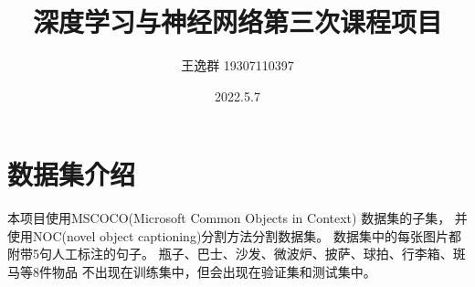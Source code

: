 \documentclass[12pt]{article}
\title{深度学习与神经网络第三次课程项目}
\author{王逸群 19307110397}
\date{2022.5.7}
\begin{document}
\maketitle

\section{数据集介绍}

本项目使用MSCOCO(Microsoft Common Objects in Context)
数据集的子集，
并使用NOC(novel object captioning)分割方法分割数据集。
数据集中的每张图片都附带5句人工标注的句子。
瓶子、巴士、沙发、微波炉、披萨、球拍、行李箱、斑马等8件物品
不出现在训练集中，但会出现在验证集和测试集中。
\end{document}
